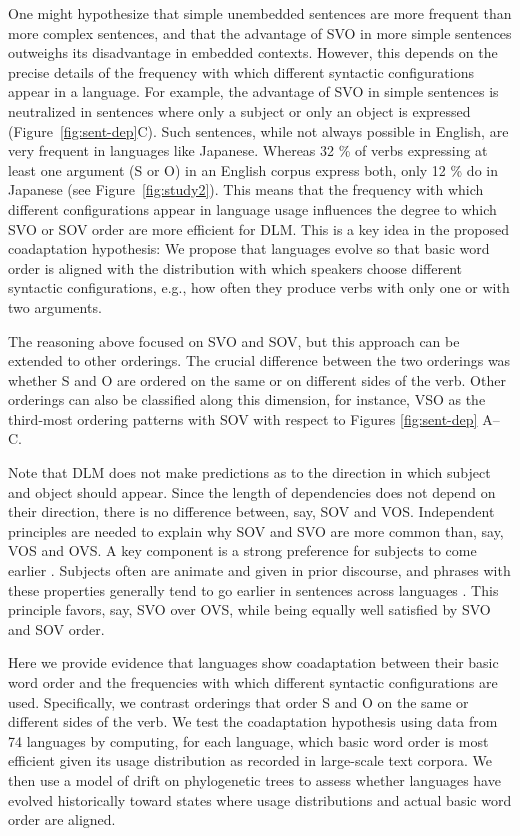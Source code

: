 \documentclass[11pt,a4paper]{article}
\begin{document}
One might hypothesize that simple unembedded sentences are more frequent than more complex sentences, and that the advantage of SVO in more simple sentences outweighs its disadvantage in embedded contexts.
However, this depends on the precise details of the frequency with which different syntactic configurations appear in a language.
For example, the advantage of SVO in simple sentences is neutralized in sentences where only a subject or only an object is expressed (Figure~\ref{fig:sent-dep}C).
Such sentences, while not always possible in English, are very frequent in languages like Japanese.
Whereas 32 \%  of verbs expressing at least one argument (S or O) in an English corpus express both, only 12 \% do in Japanese (see Figure~\ref{fig:study2}).
This means that the frequency with which different configurations appear in language usage influences the degree to which SVO or SOV order are more efficient for DLM.
This is a key idea in the proposed coadaptation hypothesis: We propose that languages evolve so that basic word order is aligned with the distribution with which speakers choose different syntactic configurations, e.g., how often they produce verbs with only one or with two arguments. 


The reasoning above focused on SVO and SOV, but this approach can be extended to other orderings.
The crucial difference between the two orderings was whether S and O are ordered on the same or on different sides of the verb.
Other orderings can also be classified along this dimension, for instance, VSO as the third-most ordering patterns with SOV with respect to Figures \ref{fig:sent-dep} A--C.

Note that DLM does not make predictions as to the direction in which subject and object should appear. Since the length of dependencies does not depend on their direction, there is no difference between, say, SOV and VOS.
Independent principles are needed to explain why SOV and SVO are more common than, say, VOS and OVS.
A key component is a strong preference for subjects to come earlier \citep{wals-81}.
Subjects often are animate and given in prior discourse, and phrases with these properties generally tend to go earlier in sentences across languages \citep{prince1981toward, mcdonald1993word}.
This principle favors, say, SVO over OVS, while being equally well satisfied by SVO and SOV order.

Here we provide evidence that languages show coadaptation between their basic word order and the frequencies with which different syntactic configurations are used.
Specifically, we contrast orderings that order S and O on the same or different sides of the verb. We test the coadaptation hypothesis using data from 74 languages by computing, for each language, which basic word order is most efficient given its usage distribution as recorded in large-scale text corpora. We then use a model of drift on phylogenetic trees to assess whether languages have evolved historically toward states where usage distributions and actual basic word order are aligned.
\end{document}
